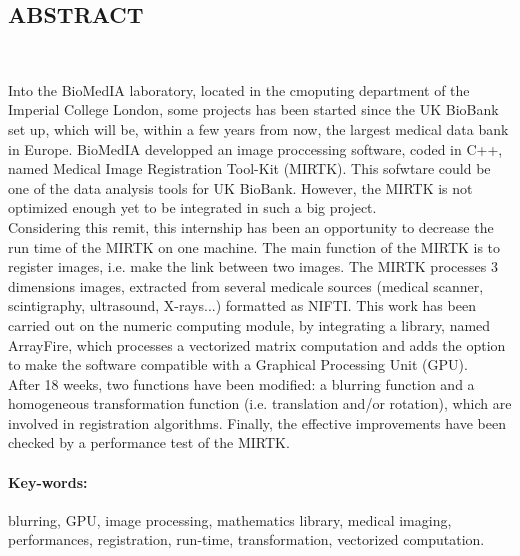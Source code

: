 \documentclass[10pt]{report}
\begin{document}
\subsection*{ABSTRACT}
~\par
Into the BioMedIA laboratory, located in the cmoputing department of the Imperial College London, some projects has been started since the UK BioBank set up, which will be, within a few years from now, the largest medical data bank in Europe. BioMedIA developped an image proccessing software, coded in C++, named Medical Image Registration Tool-Kit (MIRTK). This sofwtare could be one of the data analysis tools for UK BioBank. However, the MIRTK is not optimized enough yet to be integrated in such a big project.\\
Considering this remit, this internship has been an opportunity to decrease the run time of the MIRTK on one machine. The main function of the MIRTK is to register images, i.e. make the link between two images. The MIRTK processes 3 dimensions images, extracted from several medicale sources (medical scanner, scintigraphy, ultrasound, X-rays...) formatted as NIFTI. This work has been carried out on the numeric computing module, by integrating a library, named ArrayFire, which processes a vectorized matrix computation and adds the option to make the software compatible with a Graphical Processing Unit (GPU).\\
After 18 weeks, two functions have been modified: a blurring function and a homogeneous transformation function (i.e. translation and/or rotation), which are involved in registration algorithms. Finally, the effective improvements have been checked by a performance test of the MIRTK. 	

\paragraph*{Key-words:} blurring, GPU, image processing, mathematics library, medical imaging, performances, registration, run-time, transformation, vectorized computation.

\renewcommand\contentsname{Sommaire}
\tableofcontents

\newpage
\end{document}
